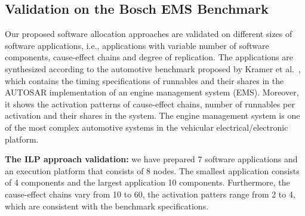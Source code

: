 \subsection*{Validation on the Bosch EMS Benchmark}
Our proposed software allocation approaches are validated on different sizes of software applications, i.e., applications with variable number of software components, cause-effect chains and degree of replication. The applications are synthesized according to the automotive benchmark proposed by Kramer et al.~\cite{Kramer2015RealFree}, which contains the timing specifications of runnables and their shares in the AUTOSAR implementation of an engine management system (EMS). Moreover, it shows the activation patterns of cause-effect chains, number of runnables per activation and their shares in the system. The engine management system is one of the most complex automotive systems in the vehicular electrical/electronic platform. 

\noindent\textbf{The ILP approach validation: }we have prepared 7 software applications and an execution platform that consists of 8 nodes. The smallest application consists of 4 components and the largest application 10 components. Furthermore, the cause-effect chains vary from 10 to 60, the activation patters range from 2 to 4, which are consistent with the benchmark specifications.
    
